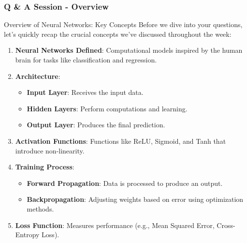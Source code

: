 \documentclass[aspectratio=169]{beamer}
\begin{document}
\begin{frame}[fragile]
    \frametitle{Q \& A Session - Overview}
    \begin{block}{Overview of Neural Networks: Key Concepts}
        Before we dive into your questions, let's quickly recap the crucial concepts we've discussed throughout the week:
    \end{block}
    \begin{enumerate}
        \item \textbf{Neural Networks Defined}: Computational models inspired by the human brain for tasks like classification and regression.
        \item \textbf{Architecture}:
        \begin{itemize}
            \item \textbf{Input Layer}: Receives the input data.
            \item \textbf{Hidden Layers}: Perform computations and learning.
            \item \textbf{Output Layer}: Produces the final prediction.
        \end{itemize}
        \item \textbf{Activation Functions}: Functions like ReLU, Sigmoid, and Tanh that introduce non-linearity.
        \item \textbf{Training Process}:
        \begin{itemize}
            \item \textbf{Forward Propagation}: Data is processed to produce an output.
            \item \textbf{Backpropagation}: Adjusting weights based on error using optimization methods.
        \end{itemize}
        \item \textbf{Loss Function}: Measures performance (e.g., Mean Squared Error, Cross-Entropy Loss).
    \end{enumerate}
\end{frame}
\end{document}
